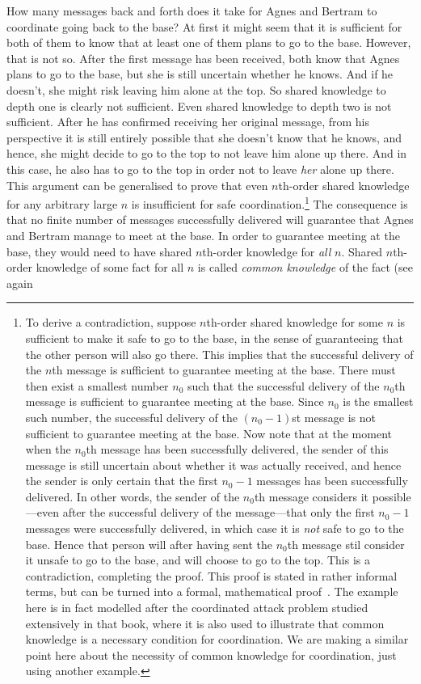 How many messages back and forth does it take for Agnes and Bertram to coordinate going back to the base? At first it might seem that it is sufficient for both of them to know that at least one of them plans to go to the base. However, that is not so. After the first message has been received, both know that Agnes plans to go to the base, but she is still uncertain whether he knows. And if he doesn't, she might risk leaving him alone at the top. So shared knowledge to depth one is clearly not sufficient. Even shared knowledge to depth two is not sufficient. After he has confirmed receiving her original message, from his perspective it is still entirely possible that she doesn't know that he knows, and hence, she might decide to go to the top to not leave him alone up there. And in this case, he also has to go to the top in order not to leave \emph{her} alone up there. This argument can be generalised to prove that even $n$th-order shared knowledge for any arbitrary large $n$ is insufficient for safe coordination.\footnote{To derive a contradiction, suppose $n$th-order shared knowledge for some $n$ is sufficient to make it safe to go to the base, in the sense of guaranteeing that the other person will also go there. This implies that the successful delivery of the $n$th message is sufficient to guarantee meeting at the base. There must then exist a smallest number $n_0$ such that the successful delivery of the $n_0$th message is sufficient to guarantee meeting at the base. Since $n_0$ is the smallest such number, the successful delivery of the $(n_0-1)$st message is not sufficient to guarantee meeting at the base. Now note that at the moment when the $n_0$th message has been successfully delivered, the sender of this message is still uncertain about whether it was actually received, and hence the sender is only certain that the first $n_0-1$ messages has been successfully delivered.  In other words, the sender of the $n_0$th message considers it possible---even after the successful delivery of the message---that only the first $n_0-1$ messages were successfully delivered, in which case it is \emph{not} safe to go to the base. Hence that person will after having sent the $n_0$th message stil consider it unsafe to go to the base, and will choose to go to the top. This is a contradiction, completing the proof. This proof is stated in rather informal terms, but can be turned into a formal, mathematical proof~\cite{fagin1995reasoning}. The example here is in fact modelled after the coordinated attack problem studied extensively in that book, where it is also used to illustrate that common knowledge is a necessary condition for coordination. We are making a similar point here about the necessity of common knowledge for coordination, just using another example.}  The consequence is that no finite number of messages successfully delivered will guarantee that Agnes and Bertram manage to meet at the base. In order to guarantee meeting at the base, they would need to have shared $n$th-order knowledge for \emph{all} $n$. Shared $n$th-order knowledge of some fact for all $n$ is called  \emph{common knowledge} of the fact (see again  %
